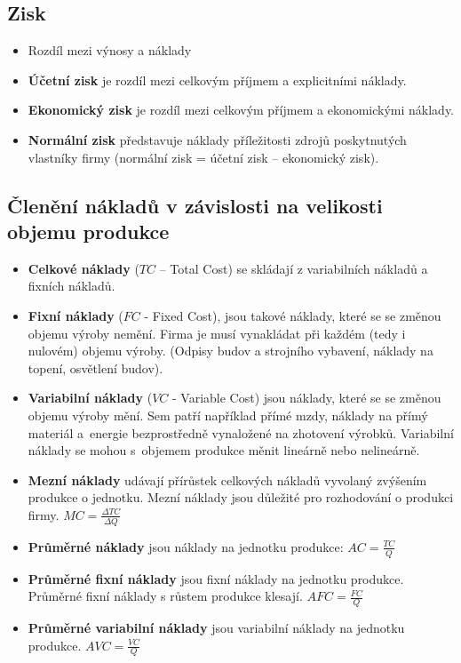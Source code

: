\subsection{Zisk}
\begin{itemize}
    \item Rozdíl mezi výnosy a náklady
    \item \textbf{Účetní zisk} je rozdíl mezi celkovým příjmem a explicitními náklady.
    \item \textbf{Ekonomický zisk} je rozdíl mezi celkovým příjmem a ekonomickými náklady.
    \item \textbf{Normální zisk} představuje náklady příležitosti zdrojů poskytnutých vlastníky
    firmy (normální zisk = účetní zisk – ekonomický zisk).
\end{itemize}

\subsection{Členění nákladů v závislosti na velikosti objemu produkce}
\begin{itemize}
    \item \textbf{Celkové náklady} ($TC$ – Total Cost) se skládají z variabilních nákladů a fixních nákladů.
    \item \textbf{Fixní náklady} ($FC$ - Fixed Cost), jsou takové náklady, které se se změnou
    objemu výroby nemění. Firma je musí vynakládat při každém (tedy i nulovém) objemu výroby. 
    (Odpisy budov a strojního vybavení, náklady na topení, osvětlení budov).
    \item \textbf{Variabilní náklady} ($VC$ - Variable Cost) jsou náklady, které se se změnou
    objemu výroby mění. Sem patří například přímé mzdy, náklady na přímý materiál a~energie
    bezprostředně vynaložené na zhotovení výrobků. Variabilní náklady se mohou s~objemem
    produkce měnit lineárně nebo nelineárně.
    \item \textbf{Mezní náklady} udávají přírůstek celkových nákladů vyvolaný zvýšením produkce o jednotku. Mezní náklady jsou důležité pro rozhodování o produkci firmy. $MC=\frac{\Delta TC}{\Delta Q}$
    \item \textbf{Průměrné náklady} jsou náklady na jednotku produkce: $AC=\frac{TC}{Q}$
    \item \textbf{Průměrné fixní náklady} jsou fixní náklady na jednotku produkce.
    Průměrné fixní náklady s růstem produkce klesají. $AFC=\frac{FC}{Q}$
    \item \textbf{Průměrné variabilní náklady} jsou variabilní náklady na jednotku produkce. $AVC=\frac{VC}{Q}$
\end{itemize}

